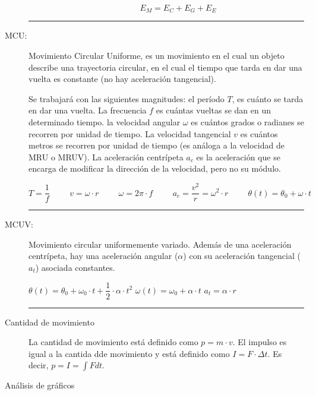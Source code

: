 \begin{description}
\begin{description}
        $$E_M = E_C + E_G + E_E$$
        
    \end{description}
    \hrule 
    \item[MCU:]\hfil

    Movimiento Circular Uniforme, es un movimiento en el cual un objeto describe una trayectoria circular, en el cual el tiempo que tarda en dar una vuelta es constante (no hay aceleración tangencial).

    Se trabajará con las siguientes magnitudes: el período $T$, es cuánto se tarda en dar una vuelta. La frecuencia $f$ es cuántas vueltas se dan en un determinado tiempo. la velocidad angular $\omega$ es cuántos grados o radianes se recorren por unidad de tiempo. La velocidad tangencial $v$ es cuántos metros se recorren por unidad de tiempo (es análoga a la velocidad de MRU o MRUV). La aceleración centrípeta $a_c$ es la aceleración que se encarga de modificar la dirección de la velocidad, pero no su módulo.
    
    $$ T = \dfrac{1}{f}
    \hspace{1cm}
    v = \omega\cdot r
    \hspace{1cm}
    \omega = 2\pi \cdot f
    \hspace{1cm}
    a_c = \dfrac{v^2}{r}=\omega^2\cdot r
    \hspace{1cm}
    \theta (t) = \theta _0 + \omega \cdot t
    $$
    \hrule

    \item[MCUV:]\hfil

    Movimiento circular uniformemente variado. Además de una aceleración centrípeta, hay una aceleración angular ($\alpha$) con su aceleración tangencial ($a_t$) asociada constantes.

    \hfil
    $\theta(t) = \theta_0 + \omega_0 \cdot t + \dfrac{1}{2} \cdot \alpha \cdot t^2$
    \hfil
    $\omega(t) = \omega_0 + \alpha \cdot t$
    \hfil
    $a_t = \alpha \cdot r$
    \hfil
    
    \skipline
    \hrule

    \item[Cantidad de movimiento]\hfill

    La cantidad de movimiento está definido como $p = m\cdot v$. El impulso es igual a la cantida dde movimiento y está definido como $I=F\cdot \Delta t$. Es decir, $p=I=\int F dt$.

    
    \item[Análisis de gráficos]\hfill
    

\end{description}
